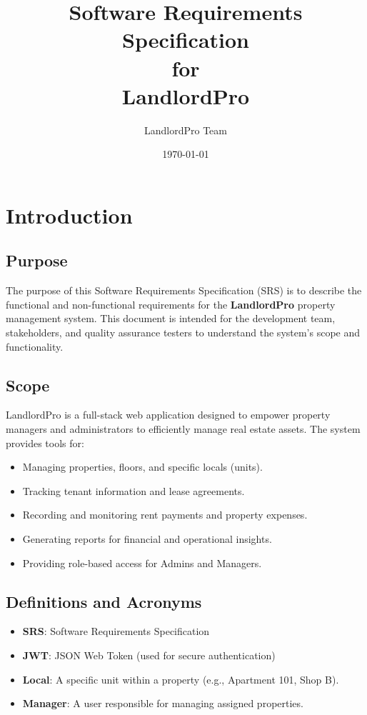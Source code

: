 \documentclass[12pt,a4paper]{article}
\title{\textcolor{brandTeal}{\textbf{Software Requirements Specification}}\\for\\LandlordPro}
\author{LandlordPro Team}
\date{\today}
\begin{document}
\maketitle
\thispagestyle{empty}
\newpage

\tableofcontents
\newpage

\section{Introduction}

\subsection{Purpose}
The purpose of this Software Requirements Specification (SRS) is to describe the functional and non-functional requirements for the \textbf{LandlordPro} property management system. This document is intended for the development team, stakeholders, and quality assurance testers to understand the system's scope and functionality.

\subsection{Scope}
LandlordPro is a full-stack web application designed to empower property managers and administrators to efficiently manage real estate assets. The system provides tools for:
\begin{itemize}
    \item Managing properties, floors, and specific locals (units).
    \item Tracking tenant information and lease agreements.
    \item Recording and monitoring rent payments and property expenses.
    \item Generating reports for financial and operational insights.
    \item Providing role-based access for Admins and Managers.
\end{itemize}

\subsection{Definitions and Acronyms}
\begin{itemize}
    \item \textbf{SRS}: Software Requirements Specification
    \item \textbf{JWT}: JSON Web Token (used for secure authentication)
    \item \textbf{Local}: A specific unit within a property (e.g., Apartment 101, Shop B).
    \item \textbf{Manager}: A user responsible for managing assigned properties.
\end{itemize}
\end{document}
